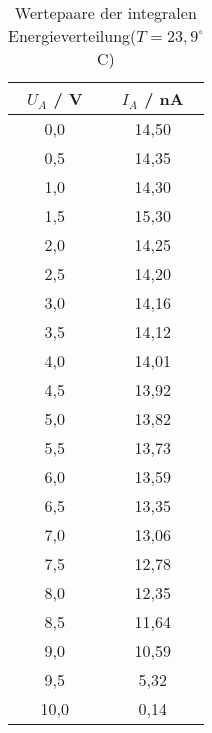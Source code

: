 \begin{table}[h]
	\begin{center}
		\begin{tabular}{cc}
			$U_A$ / V& $I_A$ / nA\\ \hline
			0,0&	14,50\\
			0,5&	14,35\\
			1,0&	14,30\\
			1,5&	15,30\\
			2,0&	14,25\\
			2,5&	14,20\\
			3,0&	14,16\\
			3,5&	14,12\\
			4,0&	14,01\\
			4,5&	13,92\\
			5,0&	13,82\\
			5,5&	13,73\\
			6,0&	13,59\\
			6,5&	13,35\\
			7,0&	13,06\\
			7,5&	12,78\\
			8,0&	12,35\\
			8,5&	11,64\\
			9,0&	10,59\\
			9,5&	5,32\\
			10,0&	0,14
		\end{tabular}
		\caption{Wertepaare der integralen Energieverteilung($T=23,9^{\circ}$ C)}
		\label{tab1}
	\end{center}
\end{table}